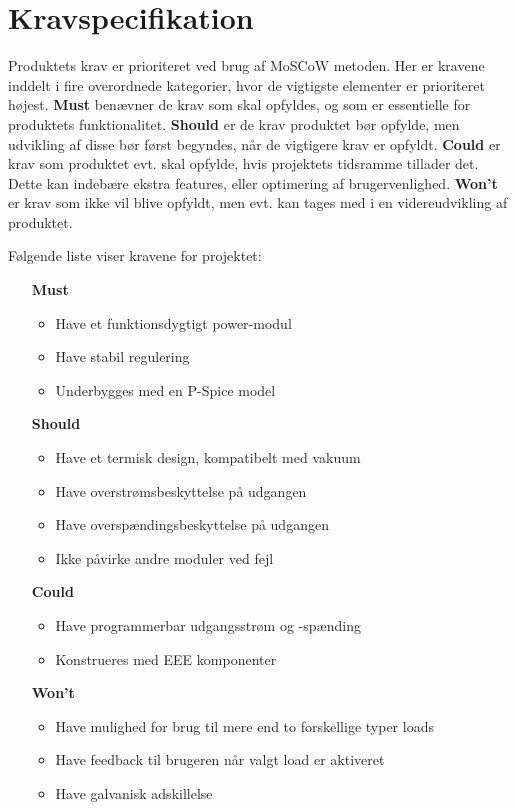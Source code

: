 \chapter{Kravspecifikation}

Produktets krav er prioriteret ved brug af MoSCoW metoden. Her er kravene inddelt i fire overordnede kategorier, hvor de vigtigste elementer er prioriteret højest. \textbf{Must} benævner de krav som skal opfyldes, og som er essentielle for produktets funktionalitet. \textbf{Should} er de krav produktet bør opfylde, men udvikling af disse bør først begyndes, når de vigtigere krav er opfyldt. \textbf{Could} er krav som produktet evt. skal opfylde, hvis projektets tidsramme tillader det. Dette kan indebære ekstra features, eller optimering af brugervenlighed. \textbf{Won't} er krav som ikke vil blive opfyldt, men evt. kan tages med i en videreudvikling af produktet.

\noindent Følgende liste viser kravene for projektet:
\begin{itemize}
	\item[\textbf{Must}]
		\begin{itemize}
			\item Have et funktionsdygtigt power-modul
			\item Have stabil regulering
			\item Underbygges med en P-Spice model

		\end{itemize}
	\item[\textbf{Should}]
		\begin{itemize}
			\item Have et termisk design, kompatibelt med vakuum
			\item Have overstrømsbeskyttelse på udgangen
			\item Have overspændingsbeskyttelse på udgangen
			\item Ikke påvirke andre moduler ved fejl

		\end{itemize}
	\item[\textbf{Could}] 
		\begin{itemize}
			\item Have programmerbar udgangsstrøm og -spænding
			\item Konstrueres med EEE komponenter

		\end{itemize}
	\item[\textbf{Won't}]
		\begin{itemize}
			\item Have mulighed for brug til mere end to forskellige typer loads
			\item Have feedback til brugeren når valgt load er aktiveret
			\item Have galvanisk adskillelse
			
		\end{itemize}
\end{itemize}

